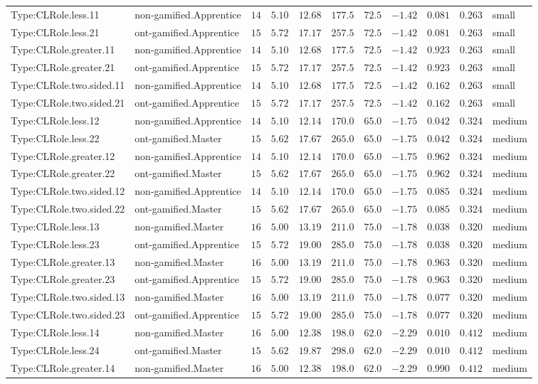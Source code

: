 \documentclass[6pt,a4paper]{article}
\begin{document}
{\begin{longtable}{llrrrrrrrrl}
Type:CLRole.less.11&non-gamified.Apprentice&$14$&$5.10$&$12.68$&$ 177.5$&$ 72.5$&$-1.42$&$0.081$&$0.263$&small\tabularnewline
Type:CLRole.less.21&ont-gamified.Apprentice&$15$&$5.72$&$17.17$&$ 257.5$&$ 72.5$&$-1.42$&$0.081$&$0.263$&small\tabularnewline
Type:CLRole.greater.11&non-gamified.Apprentice&$14$&$5.10$&$12.68$&$ 177.5$&$ 72.5$&$-1.42$&$0.923$&$0.263$&small\tabularnewline
Type:CLRole.greater.21&ont-gamified.Apprentice&$15$&$5.72$&$17.17$&$ 257.5$&$ 72.5$&$-1.42$&$0.923$&$0.263$&small\tabularnewline
Type:CLRole.two.sided.11&non-gamified.Apprentice&$14$&$5.10$&$12.68$&$ 177.5$&$ 72.5$&$-1.42$&$0.162$&$0.263$&small\tabularnewline
Type:CLRole.two.sided.21&ont-gamified.Apprentice&$15$&$5.72$&$17.17$&$ 257.5$&$ 72.5$&$-1.42$&$0.162$&$0.263$&small\tabularnewline
Type:CLRole.less.12&non-gamified.Apprentice&$14$&$5.10$&$12.14$&$ 170.0$&$ 65.0$&$-1.75$&$0.042$&$0.324$&medium\tabularnewline
Type:CLRole.less.22&ont-gamified.Master&$15$&$5.62$&$17.67$&$ 265.0$&$ 65.0$&$-1.75$&$0.042$&$0.324$&medium\tabularnewline
Type:CLRole.greater.12&non-gamified.Apprentice&$14$&$5.10$&$12.14$&$ 170.0$&$ 65.0$&$-1.75$&$0.962$&$0.324$&medium\tabularnewline
Type:CLRole.greater.22&ont-gamified.Master&$15$&$5.62$&$17.67$&$ 265.0$&$ 65.0$&$-1.75$&$0.962$&$0.324$&medium\tabularnewline
Type:CLRole.two.sided.12&non-gamified.Apprentice&$14$&$5.10$&$12.14$&$ 170.0$&$ 65.0$&$-1.75$&$0.085$&$0.324$&medium\tabularnewline
Type:CLRole.two.sided.22&ont-gamified.Master&$15$&$5.62$&$17.67$&$ 265.0$&$ 65.0$&$-1.75$&$0.085$&$0.324$&medium\tabularnewline
Type:CLRole.less.13&non-gamified.Master&$16$&$5.00$&$13.19$&$ 211.0$&$ 75.0$&$-1.78$&$0.038$&$0.320$&medium\tabularnewline
Type:CLRole.less.23&ont-gamified.Apprentice&$15$&$5.72$&$19.00$&$ 285.0$&$ 75.0$&$-1.78$&$0.038$&$0.320$&medium\tabularnewline
Type:CLRole.greater.13&non-gamified.Master&$16$&$5.00$&$13.19$&$ 211.0$&$ 75.0$&$-1.78$&$0.963$&$0.320$&medium\tabularnewline
Type:CLRole.greater.23&ont-gamified.Apprentice&$15$&$5.72$&$19.00$&$ 285.0$&$ 75.0$&$-1.78$&$0.963$&$0.320$&medium\tabularnewline
Type:CLRole.two.sided.13&non-gamified.Master&$16$&$5.00$&$13.19$&$ 211.0$&$ 75.0$&$-1.78$&$0.077$&$0.320$&medium\tabularnewline
Type:CLRole.two.sided.23&ont-gamified.Apprentice&$15$&$5.72$&$19.00$&$ 285.0$&$ 75.0$&$-1.78$&$0.077$&$0.320$&medium\tabularnewline
Type:CLRole.less.14&non-gamified.Master&$16$&$5.00$&$12.38$&$ 198.0$&$ 62.0$&$-2.29$&$0.010$&$0.412$&medium\tabularnewline
Type:CLRole.less.24&ont-gamified.Master&$15$&$5.62$&$19.87$&$ 298.0$&$ 62.0$&$-2.29$&$0.010$&$0.412$&medium\tabularnewline
Type:CLRole.greater.14&non-gamified.Master&$16$&$5.00$&$12.38$&$ 198.0$&$ 62.0$&$-2.29$&$0.990$&$0.412$&medium\tabularnewline

\end{longtable}}
\end{document}
